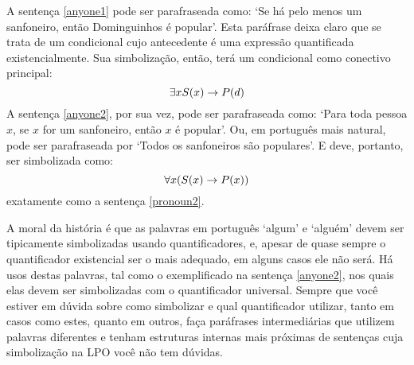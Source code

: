 A sentença \ref{anyone1} pode ser parafraseada como: `Se há pelo menos um sanfoneiro, então Dominguinhos é popular'.
Esta paráfrase deixa claro que se trata de um condicional cujo antecedente é uma expressão quantificada existencialmente.
Sua simbolização, então, terá um condicional como conectivo principal:
$$\exists x \mathord{S}(x) \rightarrow \mathord{P}(d)$$
A sentença \ref{anyone2}, por sua vez, pode ser parafraseada como:
`Para toda pessoa $x$, se $x$ for um sanfoneiro, então $x$ é popular'.
Ou, em português mais natural, pode ser parafraseada por `Todos os sanfoneiros são populares'.
E deve, portanto, ser simbolizada como:
$$\forall x(\mathord{S}(x) \rightarrow \mathord{P}(x))$$
exatamente como a sentença \ref{pronoun2}.

A moral da história é que as palavras em português `algum' e `alguém' devem ser tipicamente simbolizadas usando quantificadores, e, apesar de quase sempre o quantificador existencial ser o mais adequado, em alguns casos ele não será.
Há usos destas palavras, tal como o exemplificado na sentença \ref{anyone2}, nos quais elas devem ser simbolizadas com o quantificador universal.
Sempre que você estiver em dúvida sobre como simbolizar e qual quantificador utilizar, tanto em casos como estes, quanto em outros, faça paráfrases intermediárias que utilizem palavras diferentes e tenham estruturas internas mais próximas de sentenças cuja simbolização na LPO você não tem dúvidas.


